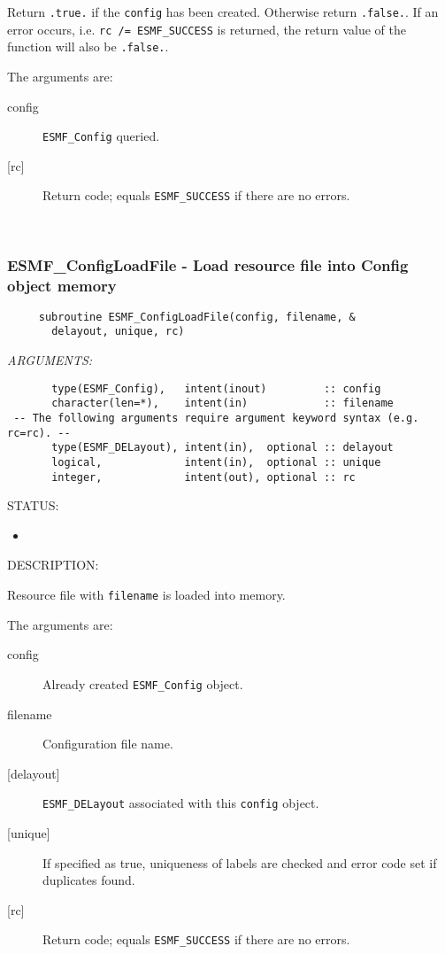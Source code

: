      Return {\tt .true.} if the {\tt config} has been created. Otherwise return 
     {\tt .false.}. If an error occurs, i.e. {\tt rc /= ESMF\_SUCCESS} is 
     returned, the return value of the function will also be {\tt .false.}.
  
   The arguments are:
     \begin{description}
     \item[config]
       {\tt ESMF\_Config} queried.
     \item[{[rc]}]
       Return code; equals {\tt ESMF\_SUCCESS} if there are no errors.
     \end{description}
   
 
\mbox{}\hrulefill\ 
 

  \subsubsection [ESMF\_ConfigLoadFile] {ESMF\_ConfigLoadFile - Load resource file into Config object memory}


  
\begin{verbatim}     subroutine ESMF_ConfigLoadFile(config, filename, &
       delayout, unique, rc)
 \end{verbatim}{\em ARGUMENTS:}
\begin{verbatim}       type(ESMF_Config),   intent(inout)         :: config     
       character(len=*),    intent(in)            :: filename 
 -- The following arguments require argument keyword syntax (e.g. rc=rc). --
       type(ESMF_DELayout), intent(in),  optional :: delayout 
       logical,             intent(in),  optional :: unique 
       integer,             intent(out), optional :: rc         \end{verbatim}
{\sf STATUS:}
   \begin{itemize}
   \item{}
   \end{itemize}
  
{\sf DESCRIPTION:\\ }

 
    Resource file with {\tt filename} is loaded into memory.
  
     The arguments are:
     \begin{description}
     \item [config]
       Already created {\tt ESMF\_Config} object.
     \item [filename]
       Configuration file name.
     \item [{[delayout]}]
       {\tt ESMF\_DELayout} associated with this {\tt config} object.
     \item [{[unique]}]
       If specified as true, uniqueness of labels are checked and 
       error code set if duplicates found.
     \item [{[rc]}]
       Return code; equals {\tt ESMF\_SUCCESS} if there are no errors.
     \end{description}
   
